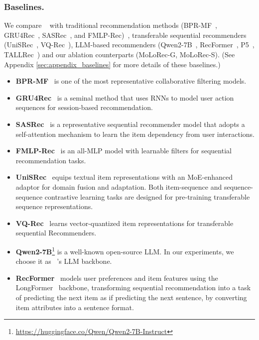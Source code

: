 \subsubsection{\textbf{Baselines.}} 
We compare \shortname~ with traditional recommendation methods (BPR-MF~\cite{10.5555/1795114.1795167}, GRU4Rec~\cite{DBLP:journals/corr/HidasiKBT15}, SASRec~\cite{kang2018self}, and FMLP-Rec)~\cite{10.1145/3485447.3512111}, transferable sequential recommenders (UniSRec~\cite{hou2022towards}, VQ-Rec~\cite{10.1145/3543507.3583434}), LLM-based recommenders (Qwen2-7B~\cite{qwen2}, RecFormer~\cite{10.1145/3580305.3599519}, P5~\cite{geng2022recommendation}, TALLRec~\cite{bao2023tallrec}) and our ablation counterparts (MoLoRec-G, MoLoRec-S). (See Appendix \ref{sec:appendix_baselines} for more details of these baselines.)
\iffalse
\begin{itemize}[leftmargin=*]
    \item \textbf{BPR-MF}~\cite{10.5555/1795114.1795167} is one of the most representative collaborative filtering models.
    \item \textbf{GRU4Rec}~\cite{DBLP:journals/corr/HidasiKBT15} is a seminal method that uses RNNs to model user action sequences for session-based recommendation. 
    \item \textbf{SASRec}~\cite{kang2018self} is a representative sequential recommender model that adopts a self-attention mechanism to learn the item dependency from user interactions.
    \item \textbf{FMLP-Rec}~\cite{10.1145/3485447.3512111} is an all-MLP model with learnable filters for sequential recommendation tasks.
    \item \textbf{UniSRec}~\cite{hou2022towards} equips textual item representations with an MoE-enhanced adaptor for domain fusion and adaptation. Both item-sequence and sequence-sequence contrastive learning tasks are designed for pre-training transferable sequence representations.
    \item \textbf{VQ-Rec}~\cite{10.1145/3543507.3583434} learns vector-quantized item representations for transferable sequential Recommenders.
    \item \textbf{Qwen2-7B}\footnote{\url{https://huggingface.co/Qwen/Qwen2-7B-Instruct}} is a well-known open-source LLM. In our experiments, we choose it as \shortname~'s LLM backbone.
    \item \textbf{RecFormer}~\cite{10.1145/3580305.3599519} models user preferences and item features using the LongFormer~\cite{beltagy2020longformer} backbone, transforming sequential recommendation into a task of predicting the next item as if predicting the next sentence, by converting item attributes into a sentence format.

\end{itemize}
